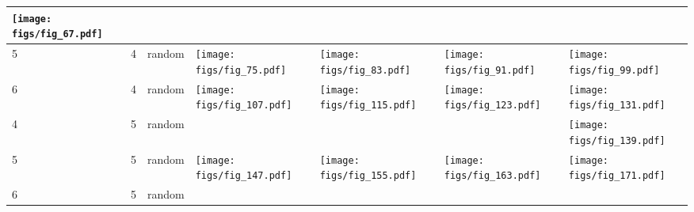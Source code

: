 \documentclass[oneside,canadian,landscape]{article}
\begin{document}
\begin{center}
\begin{longtable}{|l|l|l||l|l|l|l|}
\begin{minipage}{3.5cm}
\texttt{[image: figs/fig\_67.pdf]}
\end{minipage}
&\\ \hline
5&4&random&\begin{minipage}{3.5cm}
\texttt{[image: figs/fig\_75.pdf]}
\end{minipage}
&\begin{minipage}{3.5cm}
\texttt{[image: figs/fig\_83.pdf]}
\end{minipage}
&\begin{minipage}{3.5cm}
\texttt{[image: figs/fig\_91.pdf]}
\end{minipage}
&\begin{minipage}{3.5cm}
\texttt{[image: figs/fig\_99.pdf]}
\end{minipage}
\\ \hline
6&4&random&\begin{minipage}{3.5cm}
\texttt{[image: figs/fig\_107.pdf]}
\end{minipage}
&\begin{minipage}{3.5cm}
\texttt{[image: figs/fig\_115.pdf]}
\end{minipage}
&\begin{minipage}{3.5cm}
\texttt{[image: figs/fig\_123.pdf]}
\end{minipage}
&\begin{minipage}{3.5cm}
\texttt{[image: figs/fig\_131.pdf]}
\end{minipage}
\\ \hline
4&5&random&&&&\begin{minipage}{3.5cm}
\texttt{[image: figs/fig\_139.pdf]}
\end{minipage}
\\ \hline
5&5&random&\begin{minipage}{3.5cm}
\texttt{[image: figs/fig\_147.pdf]}
\end{minipage}
&\begin{minipage}{3.5cm}
\texttt{[image: figs/fig\_155.pdf]}
\end{minipage}
&\begin{minipage}{3.5cm}
\texttt{[image: figs/fig\_163.pdf]}
\end{minipage}
&\begin{minipage}{3.5cm}
\texttt{[image: figs/fig\_171.pdf]}
\end{minipage}
\\ \hline
6&5&random&&\begin{minipage}{3.5cm}

\end{minipage}
\end{longtable}
\end{center}
\end{document}
